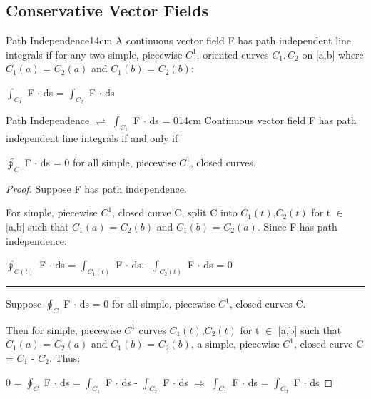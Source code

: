     \vspace{0.5cm}





\subsection{ Conservative Vector Fields }

    \begin{definition}{Path Independence}{14cm}
        A continuous vector field F has {\color{lblue} path independent}
        line integrals if for any two simple, piecewise $C^1$, oriented curves
        $C_1,C_2$ on [a,b] where $C_1(a)$ = $C_2(a)$
        and $C_1(b)$ = $C_2(b)$:

        \hspace{0.5cm}
        $\int_{C_1}$ F $\cdot$ ds = $\int_{C_2}$ F $\cdot$ ds
    \end{definition}

    \vspace{0.5cm}



    \begin{wtheorem}{Path Independence $\rightleftharpoons$
    $\int_{C_1}$ F $\cdot$ ds = 0}{14cm}
        Continuous vector field F has path independent line integrals
        if and only if
        
        $\oint_{C}$ F $\cdot$ ds = 0
        for all simple, piecewise $C^1$, closed curves.
    \end{wtheorem}

    \begin{proof}
        Suppose F has path independence.

        For simple, piecewise $C^1$, closed curve C,
        split C into $C_1(t)$,$C_2(t)$ for t $\in$ [a,b] such that
        $C_1(a)$ = $C_2(b)$ and $C_1(b)$ = $C_2(a)$.
        Since F has path independence:

        \hspace{0.5cm}
        $\oint_{C(t)}$ F $\cdot$ ds
        = $\int_{C_1(t)}$ F $\cdot$ ds - $\int_{C_2(t)}$ F $\cdot$ ds
        = 0

        \rule[0.1cm]{15.1cm}{0.01cm}

        Suppose $\oint_{C}$ F $\cdot$ ds = 0 for all simple, piecewise $C^1$,
        closed curves C.

        Then for simple, piecewise $C^1$ curves $C_1(t)$,$C_2(t)$
        for t $\in$ [a,b] such that $C_1(a)$ = $C_2(a)$ and $C_1(b)$ = $C_2(b)$,
        a simple, piecewise $C^1$, closed curve C = $C_1$ - $C_2$. Thus:

        \hspace{0.5cm}
        0 = $\oint_{C}$ F $\cdot$ ds
        = $\int_{C_1}$ F $\cdot$ ds - $\int_{C_2}$ F $\cdot$ ds
        \hspace{0.5cm}
        $\Rightarrow$
        \hspace{0.5cm}
        $\int_{C_1}$ F $\cdot$ ds = $\int_{C_2}$ F $\cdot$ ds
    \end{proof}


